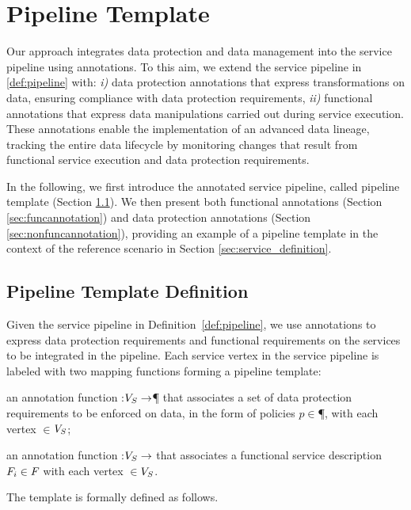 \section{Pipeline Template}\label{sec:template}
Our approach integrates data protection and data management into the service pipeline using annotations. To this aim, we extend the service pipeline in \cref{def:pipeline} with: \emph{i)} data protection annotations that express transformations on data, ensuring compliance with data protection requirements, \emph{ii)} functional annotations that express data manipulations carried out during service execution.
These annotations enable the implementation of an advanced data lineage, tracking the entire data lifecycle by monitoring changes that result from functional service execution and data protection requirements.

In the following, we first introduce the annotated service pipeline, called pipeline template (Section \ref{sec:templatedefinition}). We then present both functional annotations (Section \ref{sec:funcannotation}) and data protection annotations (Section \ref{sec:nonfuncannotation}), providing an example of a pipeline template in the context of the reference scenario in Section \ref{sec:service_definition}.

\subsection{Pipeline Template Definition}\label{sec:templatedefinition}
Given the service pipeline in Definition~\ref{def:pipeline}, we use annotations to express data protection requirements and functional requirements on the services to be integrated in the pipeline. Each service vertex in the service pipeline is labeled with two mapping functions forming a pipeline template:
\begin{enumerate*}[label=\textit{\roman*})]
  \item an annotation function \myLambda:$V_S\rightarrow$\P{} that associates a set of data protection requirements to be enforced on data, in the form of policies $p$$\in$\P{}, with each vertex $\in$$V_S$;
  \item an annotation function \myGamma:$V_S\rightarrow$\F{} that associates a functional service description $F_i\in F_{}$ with each vertex $\in$$V_S$.
\end{enumerate*}

The template is formally defined as follows.

\vspace{0.5em}


